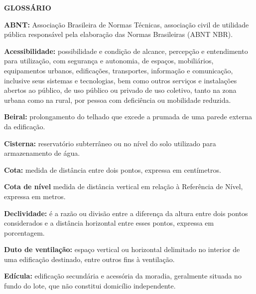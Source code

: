 \newpage
{}
{} %
\begin{center}
\textbf{\MakeUppercase{Glossário}}
\end{center}

\noindent\textbf{ABNT:} Associação Brasileira de Normas Técnicas, associação civil de utilidade pública responsável pela elaboração das Normas Brasileiras (ABNT NBR).

\vspace{10pt}\noindent\textbf{Acessibilidade:} possibilidade e condição de alcance, percepção e entendimento para utilização, com segurança e autonomia, de espaços, mobiliários, equipamentos urbanos, edificações, transportes, informação e comunicação, inclusive seus sistemas e tecnologias, bem como outros serviços e instalações abertos ao público, de uso público ou privado de uso coletivo, tanto na zona urbana como na rural, por pessoa com deficiência ou mobilidade reduzida.

\vspace{10pt}\noindent\textbf{Beiral:} prolongamento do telhado que excede a prumada de uma parede externa da edificação.

\vspace{10pt}\noindent\textbf{Cisterna:} reservatório subterrâneo ou no nível do solo utilizado para armazenamento de água.

\vspace{10pt}\noindent\textbf{Cota:} medida de distância entre dois pontos, expressa em centímetros.

\vspace{10pt}\noindent\textbf{Cota de nível} medida de distância vertical em relação à Referência de Nível, expressa em metros.

\vspace{10pt}\noindent\textbf{Declividade:} é a razão ou divisão entre a diferença da altura entre dois pontos considerados e a distância horizontal entre esses pontos, expressa em porcentagem.

\vspace{10pt}\noindent\textbf{Duto de ventilação:} espaço vertical ou horizontal delimitado no interior de uma edificação destinado, entre outros fins à ventilação.

\vspace{10pt}\noindent\textbf{Edícula:} edificação secundária e acessória da moradia, geralmente situada no fundo do lote, que não constitui domicílio independente.

